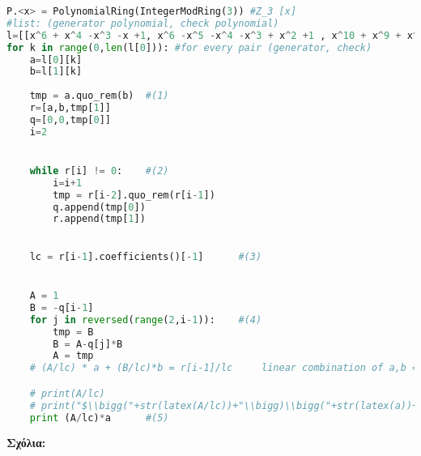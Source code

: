\documentclass[oneside,a4paper]{article}
\begin{document}
\begin{otherlanguage}{english}
\begin{lstlisting}[language=Python]
P.<x> = PolynomialRing(IntegerModRing(3)) #Z_3 [x]
#list: (generator polynomial, check polynomial)
l=[[x^6 + x^4 -x^3 -x +1, x^6 -x^5 -x^4 -x^3 + x^2 +1 , x^10 + x^9 + x^8 + x^7 + x^6 + x^5 + x^4 + x^3 + x^2 + x + 1, x-1 , x^5 + x^4 - x^3 +x^2 - 1, x^5 - x^3 + x^2 -x - 1],[x^5 -x^3 + x^2 -x -1,x^5 + x^4 - x^3 +x^2 - 1 , x-1 , x^10 + x^9 + x^8 + x^7 + x^6 + x^5 + x^4 + x^3 + x^2 + x + 1, x^6 -x^5 -x^4 -x^3 + x^2 +1 , x^6 + x^4 -x^3 -x +1 ]]
for k in range(0,len(l[0])): #for every pair (generator, check)
	a=l[0][k]
	b=l[1][k]
	
	tmp = a.quo_rem(b) 	#(1)
	r=[a,b,tmp[1]]
	q=[0,0,tmp[0]]
	i=2


	while r[i] != 0: 	#(2)
		i=i+1
		tmp = r[i-2].quo_rem(r[i-1]) 
		q.append(tmp[0])
		r.append(tmp[1])
	

	lc = r[i-1].coefficients()[-1] 		#(3)


	A = 1
	B = -q[i-1]
	for j in reversed(range(2,i-1)):	#(4)
		tmp = B
		B = A-q[j]*B
		A = tmp
	# (A/lc) * a + (B/lc)*b = r[i-1]/lc 	linear combination of a,b = 1 (gcd)

	# print(A/lc)
	# print("$\\bigg("+str(latex(A/lc))+"\\bigg)\\bigg("+str(latex(a))+"\\bigg) + \\bigg("+str(latex(B/lc))+"\\bigg)\\bigg("+str(latex(b))+"\\bigg) = "+str(latex(r[i-1]/lc))+"$")
	print (A/lc)*a 		#(5)
\end{lstlisting}
\end{otherlanguage}
\noindent \textbf{Σχόλια:}
\end{document}
